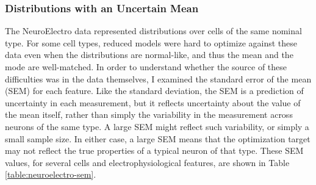 \subsubsection{Distributions with an Uncertain Mean}
The NeuroElectro data represented distributions over cells of the same nominal type.
For some cell types, reduced models were hard to optimize against these data even when the distributions are normal-like, and thus the mean and the mode are well-matched.
In order to understand whether the source of these difficulties was in the data themselves, I examined the standard error of the mean (SEM) for each feature.
Like the standard deviation, the SEM is a prediction of uncertainty in each measurement, but it reflects uncertainty about the value of the mean itself, rather than simply the variability in the measurement across neurons of the same type.
A large SEM might reflect such variability, or simply a small sample size. 
In either case, a large SEM means that the optimization target may not reflect the true properties of a typical neuron of that type.
These SEM values, for several cells and electrophysiological features, are shown in Table \ref{table:neuroelectro-sem}.

\begin{table}
\caption[Standard Error of the Mean Across NeuroElectro Data Sources]{The standard error of the mean (SEM) described the uncertainty that the sample mean value of a feature (across neurons) is close to the population mean.
The SEM values describe that uncertainty for the sample means of various features for each of 4 cell types in NeuroElectro.}
\label{table:neuroelectro-sem}
\end{table}

